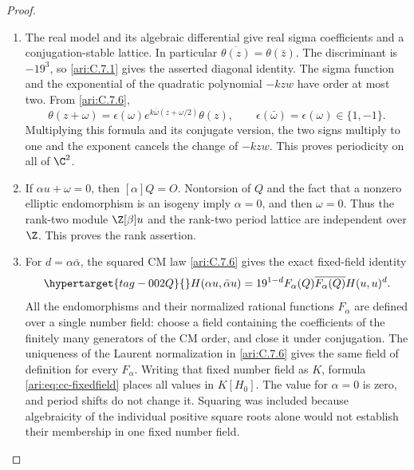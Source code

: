 \begin{proof}
\begin{enumerate}[label=\arabic*.,leftmargin=*]
\item The real model and its algebraic differential give real sigma
coefficients and a conjugation-stable lattice. In particular
$\overline{\theta(z)}=\theta(\bar z)$. The discriminant is
$-19^3$, so \ref{ari:C.7.1} gives the asserted diagonal identity.
The sigma function and the exponential of the quadratic
polynomial $-kzw$ have order at most two. From \ref{ari:C.7.6},
\[
 \theta(z+\omega)=\epsilon(\omega)
         e^{k\bar\omega(z+\omega/2)}\theta(z),
 \qquad \epsilon(\bar\omega)=\epsilon(\omega)\in\{1,-1\}.
\]
Multiplying this formula and its conjugate version, the two
signs multiply to one and the exponent cancels the change of
$-kzw$. This proves periodicity on all of $\C^2$.

\item If $\alpha u+\omega=0$, then $[\alpha]Q=O$.
Nontorsion of $Q$ and the fact that a nonzero elliptic
endomorphism is an isogeny imply $\alpha=0$, and then
$\omega=0$. Thus the rank-two module $\Z[\beta]u$ and the
rank-two period lattice are independent over $\Z$.
This proves the rank assertion.

\item For $d=\alpha\bar\alpha$, the squared CM law \ref{ari:C.7.6} gives
the exact fixed-field identity
\begin{equation}\hypertarget{tag-002Q}{}\label{ari:eq:cc-fixedfield}
 H(\alpha u,\bar\alpha u)
   =19^{1-d}F_\alpha(Q)\overline{F_\alpha(Q)}H(u,u)^d.
\end{equation}
All the endomorphisms and their normalized rational functions
$F_\alpha$ are defined over a single number field: choose
a field containing the coefficients of the finitely many
generators of the CM order, and close it under conjugation.
The uniqueness of the Laurent normalization in \ref{ari:C.7.6} gives
the same field of definition for every $F_\alpha$.
Writing that fixed number field as $K$, formula
\eqref{ari:eq:cc-fixedfield} places all values in $K[H_0]$.
The value for $\alpha=0$ is zero, and period shifts do not
change it. Squaring was included because algebraicity of the
individual positive square roots alone would not establish
their membership in one fixed number field.


\end{enumerate}
\end{proof}
